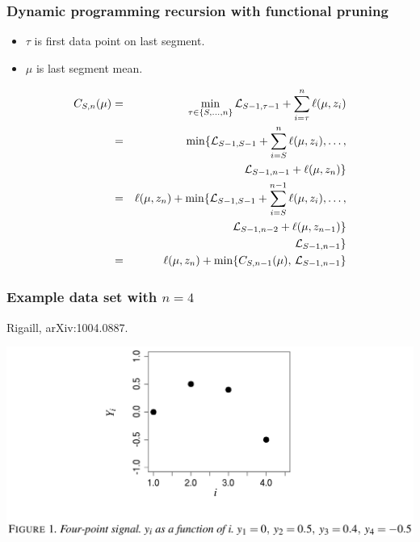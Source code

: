 \documentclass{beamer}
\begin{document}
\begin{frame}
  \frametitle{Dynamic programming recursion with functional pruning}
  \begin{itemize}
  \item $\tau$ is first data point on last segment.
  \item $\mu$ is last segment mean.
  \end{itemize}
  \begin{eqnarray*}
    C_{S,n}(\mu) &=&
    \min_{\tau\in\{S, \dots, n\} }
\mathcal L_{S-1, \tau-1}
 +
\sum_{i=\tau}^{n} \ell( \mu,  z_i)\\
&=&\min\{\mathcal L_{S-1,S-1} + \sum_{i=S}^{n} \ell( \mu,  z_i), \dots,\\
    &&\hskip 0.8cm \mathcal L_{S-1,n-1} + \ell( \mu,  z_n) \}\\
&=&\ell( \mu,  z_n) + \min\{\mathcal L_{S-1,S-1} + \sum_{i=S}^{n-1} \ell( \mu,  z_i), \dots,\\
    &&\hskip 2.7cm \mathcal L_{S-1,n-2}  +\ell( \mu,  z_{n-1})\}\\
    &&\hskip 2.7cm \mathcal L_{S-1,n-1}  \}\\
&=&\ell( \mu,  z_n)+
\min\{
    C_{S,n-1}(\mu),\,  
    \mathcal L_{S-1,n-1}
\}
  \end{eqnarray*}
\end{frame}

\begin{frame}
  \frametitle{Example data set with $n=4$}
  Rigaill, arXiv:1004.0887.

  \includegraphics[width=\textwidth]{screenshot-figure-1}
\end{frame}
\end{document}

